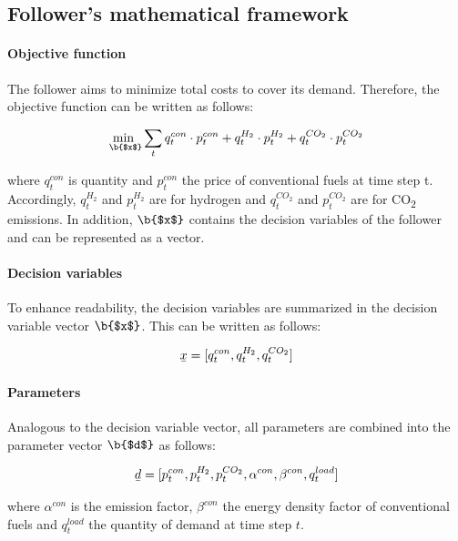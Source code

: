\documentclass[review]{elsarticle}
\begin{document}
\subsection{Follower's mathematical framework}\label{sec:lower}

\paragraph{Objective function} The follower aims to minimize total costs to cover its demand. Therefore, the objective function can be written as follows: 

\begin{align}\label{objective}
\underset{\b{$x$}}{\mathrm{min~}}  \sum_{t} q_{t}^{con} \cdot p_{t}^{con} + q_{t}^{H_2} \cdot p_{t}^{H_2} +  q_{t}^{CO_2} \cdot p_{t}^{CO_2}
\end{align}

where $ q_{t}^{con}$ is quantity and  $ p_{t}^{con}$ the price of conventional fuels at time step t. Accordingly, $q_{t}^{H_2}$ and $p_{t}^{H_2}$ are for hydrogen and $q_{t}^{CO_2}$ and $p_{t}^{CO_2}$ are for CO\textsubscript{2} emissions. In addition, $\b{$x$}$ contains the decision variables of the follower and can be represented as a vector. 

\paragraph{Decision variables} To enhance readability, the decision variables are summarized in the decision variable vector  $\b{$x$}$. This can be written as follows:

\begin{align}
\b{$x$}=[q_{t}^{con},q_{t}^{H_2},q_{t}^{CO_2}]
\end{align}

\paragraph{Parameters} Analogous to the decision variable vector, all parameters are combined into the parameter vector $\b{$d$}$ as follows:

\begin{align}
\b{$d$}=[p_{t}^{con},p_{t}^{H_2},p_{t}^{CO_2}, \alpha^{con}, \beta^{con}, q_{t}^{load}]
\end{align}

where $\alpha^{con}$ is the emission factor, $\beta^{con}$ the energy density factor of conventional fuels and $q_{t}^{load}$ the quantity of demand at time step $t$.
\end{document}
